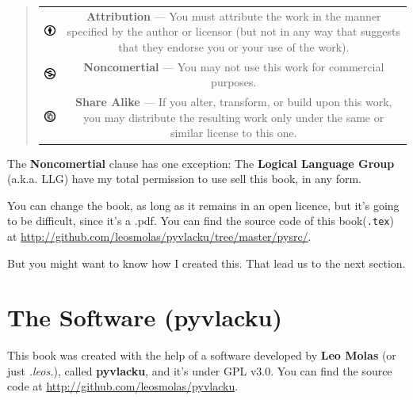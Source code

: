 \documentclass[ipa,twoside]{report}
\begin{document}
\begin{quotation}
\begin{tabular}{ T S }
  \includegraphics[width=3em]{img/bylarge.png} & \textbf{Attribution} --- You must attribute the work in the manner specified by the author or licensor (but not in any way that suggests that they endorse you or your use of the work). \\
  \includegraphics[width=3em]{img/nclarge.png} & \textbf{Noncomertial} --- You may not use this work for commercial purposes.  \\
  \includegraphics[width=3em]{img/sharelarge.png} & \textbf{Share Alike} --- If you alter, transform, or build upon this work, you may distribute the resulting work only under the same or similar license to this one. \\
\end{tabular}

\end{quotation}

The \textbf{Noncomertial} clause has one exception: The \textbf{Logical Language Group} (a.k.a. LLG) have my total permission to use sell this book, in any form.

You can change the book, as long as it remains in an open licence, but it's going to be difficult, since it's a .pdf. You can find the source code of this book(\texttt{.tex}) at \url{http://github.com/leosmolas/pyvlacku/tree/master/pysrc/}. 

But you might want to know how I created this. That lead us to the next section. 

\section*{The Software (pyvlacku)}
This book was created with the help of a software developed by \textbf{Leo Molas} (or just \textsl{.leos.}), called \textbf{pyvlacku}, and it's under GPL v3.0. You can find the source code at \url{http://github.com/leosmolas/pyvlacku}. 
\end{document}
